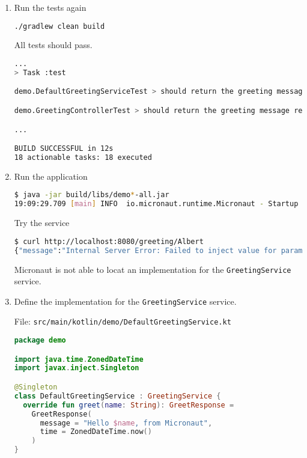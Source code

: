 \begin{enumerate}
\item Run the tests again

\begin{lstlisting}[language=bash]
./gradlew clean build
\end{lstlisting}

All tests should pass.

\begin{lstlisting}[language=bash]
...
> Task :test

demo.DefaultGreetingServiceTest > should return the greeting message for the given name PASSED

demo.GreetingControllerTest > should return the greeting message returned by the greeting service PASSED

...

BUILD SUCCESSFUL in 12s
18 actionable tasks: 18 executed
\end{lstlisting}

\item Run the application

\begin{lstlisting}[language=bash]
$ java -jar build/libs/demo*-all.jar
19:09:29.709 [main] INFO  io.micronaut.runtime.Micronaut - Startup completed in 924ms. Server Running: http://localhost:8080
\end{lstlisting}

Try the service

\begin{lstlisting}[language=bash]
$ curl http://localhost:8080/greeting/Albert
{"message":"Internal Server Error: Failed to inject value for parameter [service] of class: demo.GreetingController\n\nMessage: No bean of type [demo.GreetingService] exists. Make sure the bean is not disabled by bean requirements (enable trace logging for 'io.micronaut.context.condition' to check) and if the bean is enabled then ensure the class is declared a bean and annotation processing is enabled (for Java and Kotlin the 'micronaut-inject-java' dependency should be configured as an annotation processor).\nPath Taken: new GreetingController([GreetingService service])"}
\end{lstlisting}

Micronaut is not able to locat an implementation for the \texttt{GreetingService} service.

\item Define the implementation for the \texttt{GreetingService} service.

File: \texttt{src/main/kotlin/demo/DefaultGreetingService.kt}
\begin{lstlisting}[language=Kotlin]
package demo

import java.time.ZonedDateTime
import javax.inject.Singleton

@Singleton
class DefaultGreetingService : GreetingService {
  override fun greet(name: String): GreetResponse =
    GreetResponse(
      message = "Hello $name, from Micronaut",
      time = ZonedDateTime.now()
    )
}
\end{lstlisting}

\end{enumerate}


